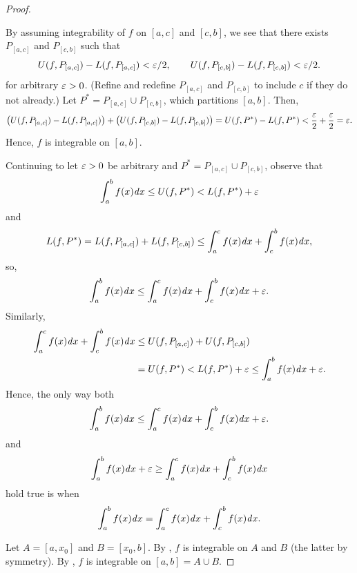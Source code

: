 \begin{problem}
\begin{proof}
\begin{subproof}
      \begin{backwardimplication}
        By assuming integrability of $f$ on $[a,c]$ and $[c,b]$, we see that there exists $P_{[a,c]}$ 
        and $P_{[c,b]}$ such that
        \[
          U(f, P_{[a,c]}) - L(f, P_{[a,c]}) < \varepsilon/2, \qquad U(f, P_{[c,b]}) - L(f, P_{[c,b]}) < \varepsilon/2.
        \]
        for arbitrary $\varepsilon > 0$. (Refine and redefine $P_{[a,c]}$ and $P_{[c,b]}$ to include $c$ 
        if they do not already.) Let $P^{*} = P_{[a, c]} \cup P_{[c, b]}$, which partitions $[a, b]$.
        Then,
        \[
          \left( U(f, P_{[a, c]}) - L(f, P_{[a, c]}) \right) + \left( U(f, P_{[c, b]}) - L(f, P_{[c, b]}) \right) = U(f, P^{*}) - L(f, P^{*}) < \frac{\varepsilon}{2} + \frac{\varepsilon}{2} = \varepsilon. 
        \]
        Hence, $f$ is integrable on $[a, b]$.
      \end{backwardimplication}

      Continuing to let $\varepsilon > 0$ be arbitrary and $P^{*} = P_{[a, c]} \cup P_{[c, b]}$, observe that
      \[
        \int_{a}^{b} f(x) \mathit{d} x \leq U(f, P^{*}) < L(f, P^{*}) + \varepsilon
      \]
      and
      \[
        L(f, P^{*}) = L(f, P_{[a, c]}) + L(f, P_{[c, b]}) \leq \int_{a}^{c} f(x) \mathit{d} x + \int_{c}^{b} f(x) \mathit{d} x,
      \]
      so,
      \[
        \int_{a}^{b} f(x) \mathit{d} x \leq \int_{a}^{c} f(x) \mathit{d} x + \int_{c}^{b} f(x) \mathit{d} x + \varepsilon.
      \]
      Similarly,
      \begin{align*}
        \int_{a}^{c} f(x) \mathit{d} x + \int_{c}^{b} f(x) \mathit{d} x &\leq U(f, P_{[a,c]}) + U(f, P_{[c,b]}) \\
                                                      &= U(f, P^{*}) < L(f, P^{*}) + \varepsilon \leq \int_{a}^{b} f(x) \mathit{d} x + \varepsilon.
      \end{align*}
      Hence, the only way both
      \[
        \int_{a}^{b} f(x) \mathit{d} x \leq \int_{a}^{c} f(x) \mathit{d} x + \int_{c}^{b} f(x) \mathit{d} x + \varepsilon.
      \]
      and
      \[
        \int_{a}^{b} f(x) \mathit{d} x + \varepsilon  \geq \int_{a}^{c} f(x) \mathit{d} x + \int_{c}^{b} f(x) \mathit{d} x
      \]
      hold true is when
      \[
        \int_{a}^{b} f(x) \mathit{d} x =\int_{a}^{c} f(x) \mathit{d} x + \int_{c}^{b} f(x) \mathit{d} x.
      \]
    \end{subproof}

    Let $A = [a, x_{0}]$ and $B = [x_{0}, b]$. By , $f$ is integrable on $A$ and $B$ (the latter by symmetry).
    By , $f$ is integrable on $[a, b] = A \cup B$.
  \end{proof}

\end{problem}

